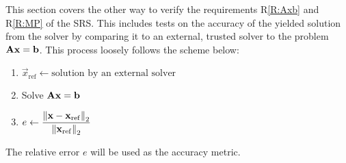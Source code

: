 \documentclass[12pt, titlepage]{article}
\newcommand{\rref}[1]{R\ref{#1}}
\begin{document}
This section covers the other way to verify the requirements \rref{R:Axb} and
\rref{R:MP} of the SRS. This includes tests on the accuracy of the yielded
solution from the solver by comparing it to an external, trusted solver to the
problem \(\mathbf{A}\mathbf{x} = \mathbf{b}\). This process loosely follows the scheme
below:

\begin{enumerate}
\item \(\vec{x}_\mathrm{ref} \gets \text{solution by an external solver}\)
\item Solve \(\mathbf{A}\mathbf{x} = \mathbf{b}\)
\item \(e \gets \displaystyle \frac{\left\lVert\mathbf{x} - \mathbf{x}_\mathrm{ref}\right\rVert_2}{\left\lVert\mathbf{x}_\mathrm{ref}\right\rVert_2}\)
\end{enumerate}

The relative error \(e\) will be used as the accuracy metric.
\end{document}

